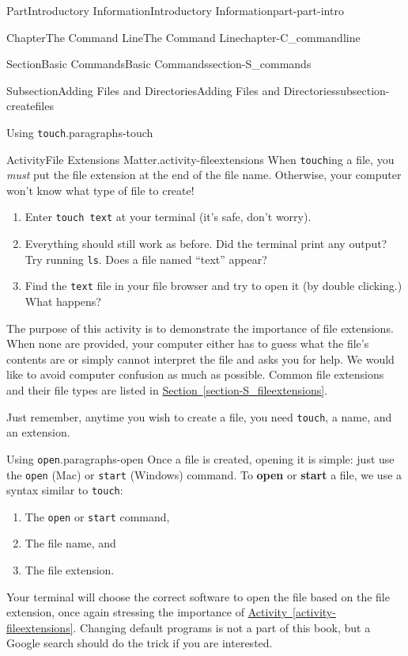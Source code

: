\documentclass[oneside,10pt,]{book}
\newcommand{\xreffont}{\relax}
\newcommand{\mono}[1]{\texttt{#1}}
\newcommand{\terminology}[1]{\textbf{#1}}
\begin{document}
\begin{partptx}{Part}{Introductory Information}{}{Introductory Information}{}{}{part-part-intro}
\begin{chapterptx}{Chapter}{The Command Line}{}{The Command Line}{}{}{chapter-C_commandline}
\begin{sectionptx}{Section}{Basic Commands}{}{Basic Commands}{}{}{section-S_commands}
\begin{subsectionptx}{Subsection}{Adding Files and Directories}{}{Adding Files and Directories}{}{}{subsection-createfiles}
\begin{paragraphs}{Using \mono{touch}.}{paragraphs-touch}
\begin{activity}{Activity}{File Extensions Matter.}{activity-fileextensions}%
%
%
When \mono{touch}ing a file, you \emph{must} put the file extension at the end of the file name. Otherwise, your computer won't know what type of file to create!%
\begin{enumerate}[font=\bfseries,label=(\alph*),ref=\alph*]%
\item{}Enter \mono{touch text} at your terminal (it's safe, don't worry).%
\item{}Everything should still work as before. Did the terminal print any output? Try running \mono{ls}. Does a file named ``text'' appear?%
\item{}Find the \mono{text} file in your file browser and try to open it (by double clicking.) What happens?%
\end{enumerate}%
The purpose of this activity is to demonstrate the importance of file extensions. When none are provided, your computer either has to guess what the file's contents are or simply cannot interpret the file and asks you for help. We would like to avoid computer confusion as much as possible. Common file extensions and their file types are listed in \hyperref[section-S_fileextensions]{Section~{\xreffont\ref{section-S_fileextensions}}}.%
\end{activity}%
Just remember, anytime you wish to create a file, you need \mono{touch}, a name, and an extension.%
\end{paragraphs}%
\begin{paragraphs}{Using \mono{open}.}{paragraphs-open}%
\index{\mono{open}}%
\index{\mono{start}}%
%
%
%
Once a file is created, opening it is simple: just use the \mono{open} (Mac) or \mono{start} (Windows) command. To \terminology{open} or \terminology{start} a file, we use a syntax similar to \mono{touch}:%
\begin{enumerate}
\item{}The \mono{open} or \mono{start} command,%
\item{}The file name, and%
\item{}The file extension.%
\end{enumerate}
Your terminal will choose the correct software to open the file based on the file extension, once again stressing the importance of \hyperref[activity-fileextensions]{Activity~{\xreffont\ref{activity-fileextensions}}}. Changing default programs is not a part of this book, but a Google search should do the trick if you are interested.%

\end{paragraphs}
\end{subsectionptx}
\end{sectionptx}
\end{chapterptx}
\end{partptx}
\end{document}
